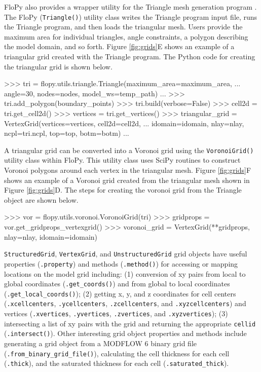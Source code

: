 \documentclass[11pt, oneside]{article}  	%
\begin{document}
FloPy also provides a wrapper utility for the Triangle mesh generation program \citep{trianglemesh}. The FloPy (\texttt{Triangle()}) utility class writes the Triangle program input file, runs the Triangle program, and then loads the triangular mesh. Users provide the maximum area for individual triangles, angle constraints, a polygon describing the model domain, and so forth. Figure \ref{fig:grids}E shows an example of a triangular grid created with the Triangle program. The Python code for creating the triangular grid is shown below.

\begin{python}
>>> tri = flopy.utils.triangle.Triangle(maximum_area=maximum_area, 
... angle=30, nodes=nodes, model_ws=temp_path)
...
>>> tri.add_polygon(boundary_points)
>>> tri.build(verbose=False)
>>> cell2d = tri.get_cell2d()
>>> vertices = tri.get_vertices()
>>> triangular_grid = VertexGrid(vertices=vertices, cell2d=cell2d, 
... idomain=idomain, nlay=nlay, ncpl=tri.ncpl, top=top, botm=botm)
...
\end{python}

A triangular grid can be converted into a Voronoi grid using the \texttt{VoronoiGrid()} utility class within FloPy. This utility class uses SciPy routines \citep{2020SciPy-NMeth} to construct Voronoi polygons around each vertex in the triangular mesh. Figure \ref{fig:grids}F shows an example of a Voronoi grid created from the triangular mesh shown in Figure \ref{fig:grids}D. The steps for creating the voronoi grid from the Triangle object are shown below.

\begin{python}
>>> vor = flopy.utils.voronoi.VoronoiGrid(tri)
>>> gridprops = vor.get_gridprops_vertexgrid()
>>> voronoi_grid = VertexGrid(**gridprops, nlay=nlay, idomain=idomain)
\end{python}

\texttt{StructuredGrid}, \texttt{VertexGrid}, and \texttt{UnstructuredGrid} grid objects have useful properties (\texttt{.property}) and methods (\texttt{.method()}) for accessing or mapping locations on the model grid including: (1) conversion of xy pairs from local to global coordinates (\texttt{.get\_coords()}) and from global to local coordinates (\texttt{.get\_local\_coords()}); (2) getting x, y, and z coordinates for cell centers (\texttt{.xcellcenters}, \texttt{.ycellcenters}, \texttt{.zcellcenters}, and \texttt{.xyzcellcenters}) and vertices (\texttt{.xvertices}, \texttt{.yvertices}, \texttt{.zvertices}, and \texttt{.xyzvertices}); (3) intersecting a list of xy pairs with the grid and returning the appropriate \texttt{cellid} (\texttt{.intersect()}). Other interesting grid object properties and methods include generating a grid object from a MODFLOW 6 binary grid file (\texttt{.from\_binary\_grid\_file()}), calculating the cell thickness for each cell (\texttt{.thick}), and the saturated thickness for each cell (\texttt{.saturated\_thick}).
\end{document}
